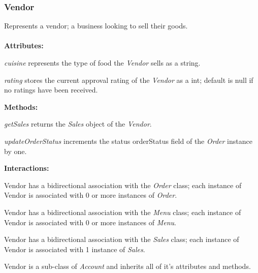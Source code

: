 \subsubsection{Vendor}
Represents a vendor; a business looking to sell their goods. \\ \\
\textbf{Attributes:}
\begin{description}
\item\textit{cuisine} represents the type of food the \emph{Vendor} sells as a string.
\item\textit{rating} stores the current approval rating of the \emph{Vendor} as a int; default is null if no ratings have been received.
\end{description}
\textbf{Methods:}
\begin{description}
\item\textit{getSales} returns the \emph{Sales} object of the \emph{Vendor}.
\item\textit{updateOrderStatus} increments the status orderStatus field of the \emph{Order} instance by one.
\end{description}
\textbf{Interactions:}
\begin{description}
\item Vendor has a bidirectional association with the \emph{Order} class; each instance of Vendor is associated with 0 or more instances of \emph{Order}.
\item Vendor has a bidirectional association with the \emph{Menu} class; each instance of Vendor is associated with 0 or more instances of \emph{Menu}.
\item Vendor has a bidirectional association with the \emph{Sales} class; each instance of Vendor is associated with 1 instance of \emph{Sales}.
\item Vendor is a sub-class of \emph{Account} and inherits all of it's attributes and methods.
\end{description}
\vspace{.2cm}
